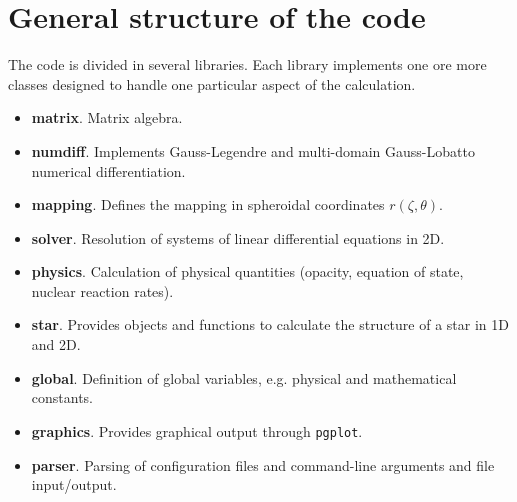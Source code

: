 \chapter{General structure of the code}

The code is divided in several libraries. Each library implements one ore more classes designed to
handle one particular aspect of the calculation. 

\begin{itemize}
\item {\bf matrix}. Matrix algebra.
\item {\bf numdiff}. Implements Gauss-Legendre and multi-domain Gauss-Lobatto
numerical differentiation.
\item {\bf mapping}. Defines the mapping in spheroidal coordinates $r(\zeta,\theta)$. 
\item {\bf solver}. Resolution of systems of linear differential equations in 2D.
\item {\bf physics}. Calculation of physical quantities (opacity, equation of state, nuclear reaction rates).
\item {\bf star}. Provides objects and functions to calculate the structure of a star in 1D and 2D.
\item {\bf global}. Definition of global variables, e.g. physical and mathematical constants.
\item {\bf graphics}. Provides graphical output through {\tt pgplot}.
\item {\bf parser}. Parsing of configuration files and command-line arguments and file input/output.
\end{itemize} 


